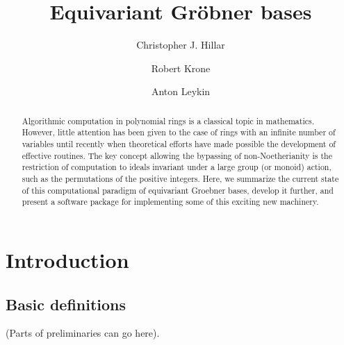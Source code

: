 \documentclass[11pt]{amsart}
\theoremstyle{definition}
\theoremstyle{remark}
\numberwithin{equation}{section}
\begin{document}
 \title{Equivariant Gr\"obner bases}

\author{Christopher J. Hillar}
\address{Redwood Center for Theoretical Neuroscience, University of California, Berkeley}

\author{Robert Krone}
\address{Georgia Tech University, Atlanta, GA}

\author{Anton Leykin}
\address{Georgia Tech University, Atlanta, GA}


%





\begin{abstract}
Algorithmic computation in polynomial rings is a classical topic in mathematics. However, little attention has been given to the case of rings with an infinite number of variables until recently when theoretical efforts have made possible the development of effective routines. The key concept allowing the bypassing of non-Noetherianity is the restriction of computation to ideals invariant under a large group (or monoid) action, such as the permutations of the positive integers. Here, we summarize the current state of this computational paradigm of equivariant Groebner bases, develop it further, and present a software package for implementing some of this exciting new machinery.
\end{abstract} 

\maketitle 
\tableofcontents
\section{Introduction}
 
\subsection{Basic definitions}

(Parts of preliminaries can go here).
\end{document}
